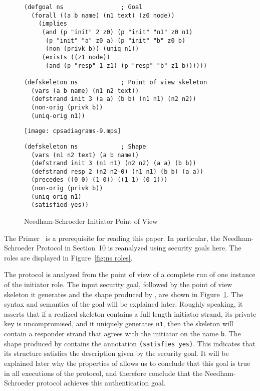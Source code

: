 \documentclass[12pt]{article}
\begin{document}
\begin{figure}
\begin{verbatim}
(defgoal ns                ; Goal
  (forall ((a b name) (n1 text) (z0 node))
    (implies
     (and (p "init" 2 z0) (p "init" "n1" z0 n1)
      (p "init" "a" z0 a) (p "init" "b" z0 b)
      (non (privk b)) (uniq n1))
     (exists ((z1 node))
      (and (p "resp" 1 z1) (p "resp" "b" z1 b))))))

(defskeleton ns            ; Point of view skeleton
  (vars (a b name) (n1 n2 text))
  (defstrand init 3 (a a) (b b) (n1 n1) (n2 n2))
  (non-orig (privk b))
  (uniq-orig n1))
\end{verbatim}
\begin{center}
\texttt{[image: cpsadiagrams-9.mps]}
\end{center}
\begin{verbatim}
(defskeleton ns            ; Shape
  (vars (n1 n2 text) (a b name))
  (defstrand init 3 (n1 n1) (n2 n2) (a a) (b b))
  (defstrand resp 2 (n2 n2-0) (n1 n1) (b b) (a a))
  (precedes ((0 0) (1 0)) ((1 1) (0 1)))
  (non-orig (privk b))
  (uniq-orig n1)
  (satisfied yes))
\end{verbatim}
\caption{Needham-Schroeder Initiator Point of View}
\label{fig:ns init}
\end{figure}

The {\cpsa} Primer~\cite{cpsaprimer09} is a prerequisite for reading
this paper.  In particular, the Needham-Schroeder Protocol in
Section~10 is reanalyzed using security goals here.  The roles are
displayed in Figure~\ref{fig:ns roles}.

The protocol is analyzed from the point of view of a complete run of
one instance of the initiator role.  The input security goal, followed
by the point of view skeleton it generates and the shape produced by
{\cpsa}, are shown in Figure~\ref{fig:ns init}.  The syntax and
semantics of the goal will be explained later.  Roughly speaking, it
asserts that if a realized skeleton contains a full length initiator
strand, its private key is uncompromised, and it uniquely generates
\texttt{n1}, then the skeleton will contain a responder strand that
agrees with the initiator on the name \texttt{b}.  The shape produced
by {\cpsa} contains the annotation \texttt{(satisfies yes)}.  This
indicates that its structure satisfies the description given by the
security goal.  It will be explained later why the properties of
{\cpsa} allows us to conclude that this goal is true in all executions
of the protocol, and therefore conclude that the Needham-Schroeder
protocol achieves this authentication goal.
\end{document}
